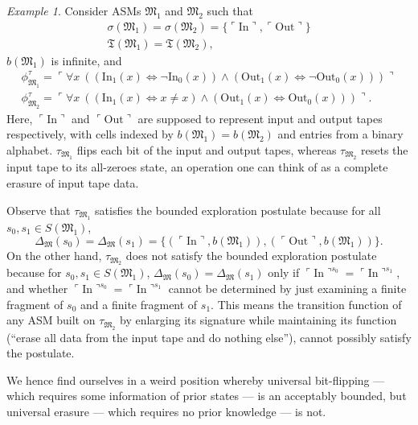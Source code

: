 \documentclass[12pt, twoside]{memoir}
\numberwithin{equation}{section}
\theoremstyle{definition}
\theoremstyle{remark}
\newtheorem{ex}[thm]{Example}
\theoremstyle{definition}
\theoremstyle{definition}
\theoremstyle{definition}
\theoremstyle{remark}
\begin{document}
\begin{ex}\label{ex218}
Consider ASMs $\mathfrak{M}_1$ and $\mathfrak{M}_2$ such that 
\begin{gather*}
    \sigma(\mathfrak{M}_1) = \sigma(\mathfrak{M}_2) = \{\ulcorner \mathrm{In} \urcorner, \ulcorner \mathrm{Out} \urcorner\} \\
    \mathfrak{T}(\mathfrak{M}_1) = \mathfrak{T}(\mathfrak{M}_2) \text{,}
\end{gather*}
$b(\mathfrak{M}_1)$ is infinite, and
\begin{gather*}
    \phi^{\tau}_{\mathfrak{M}_1} = \ulcorner \forall x \ ((\mathrm{In}_1(x) \iff \neg \mathrm{In}_0(x)) \wedge (\mathrm{Out}_1(x) \iff \neg \mathrm{Out}_0(x))) \urcorner \\
    \phi^{\tau}_{\mathfrak{M}_2} = \ulcorner \forall x \ ((\mathrm{In}_1(x) \iff x \neq x) \wedge (\mathrm{Out}_1(x) \iff \mathrm{Out}_0(x))) \urcorner \text{.}
\end{gather*}
Here, $\ulcorner \mathrm{In} \urcorner$ and $\ulcorner \mathrm{Out} \urcorner$ are supposed to represent input and output tapes respectively, with cells indexed by $b(\mathfrak{M}_1) = b(\mathfrak{M}_2)$ and entries from a binary alphabet. $\tau_{\mathfrak{M}_1}$ flips each bit of the input and output tapes, whereas $\tau_{\mathfrak{M}_2}$ resets the input tape to its all-zeroes state, an operation one can think of as a complete erasure of input tape data.

Observe that $\tau_{\mathfrak{M}_1}$ satisfies the bounded exploration postulate because for all $s_0, s_1 \in S(\mathfrak{M}_1)$, 
\begin{equation*}
    \Delta_{\mathfrak{M}}(s_0) = \Delta_{\mathfrak{M}}(s_1) = \{(\ulcorner \mathrm{In} \urcorner, b(\mathfrak{M}_1)), (\ulcorner \mathrm{Out} \urcorner, b(\mathfrak{M}_1))\} \text{.}
\end{equation*}
On the other hand, $\tau_{\mathfrak{M}_2}$ does not satisfy the bounded exploration postulate because for $s_0, s_1 \in S(\mathfrak{M}_1)$, $\Delta_{\mathfrak{M}}(s_0) = \Delta_{\mathfrak{M}}(s_1)$ only if $\ulcorner \mathrm{In} \urcorner^{s_0} = \ulcorner \mathrm{In} \urcorner^{s_1}$, and whether $\ulcorner \mathrm{In} \urcorner^{s_0} = \ulcorner \mathrm{In} \urcorner^{s_1}$ cannot be determined by just examining a finite fragment of $s_0$ and a finite fragment of $s_1$. This means the transition function of any ASM built on $\tau_{\mathfrak{M}_2}$ by enlarging its signature while maintaining its function (``erase all data from the input tape and do nothing else''), cannot possibly satisfy the postulate.

We hence find ourselves in a weird position whereby universal bit-flipping --- which requires some information of prior states --- is an acceptably bounded, but universal erasure --- which requires no prior knowledge --- is not.
\end{ex}
\end{document}
